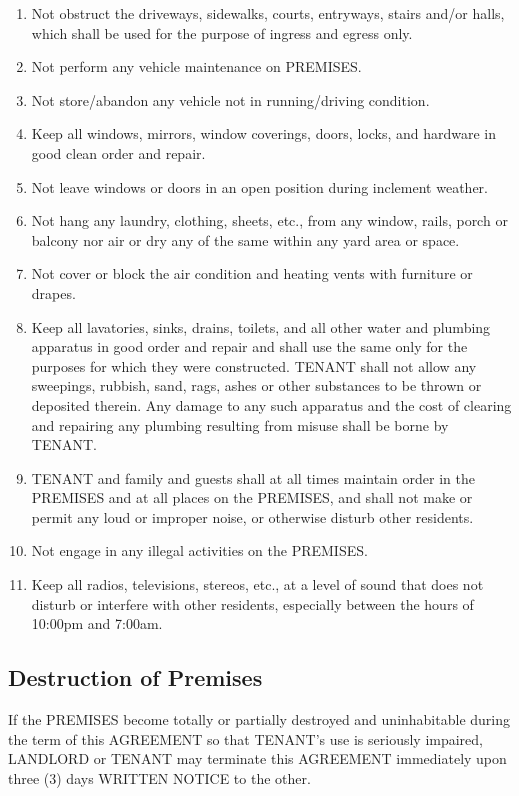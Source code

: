 \documentclass[11pt]{article}
\begin{document}
\begin{enumerate}
\item Not obstruct the driveways, sidewalks, courts, entryways, stairs
and/or halls, which shall be used for the purpose of ingress and
egress only.
\item Not perform any vehicle maintenance on PREMISES.
\item Not store/abandon any vehicle not in running/driving condition.
\item Keep all windows, mirrors, window coverings, doors, locks, and
hardware in good clean order and repair.
\item Not leave windows or doors in an open position during inclement weather.
\item Not hang any laundry, clothing, sheets, etc., from any window,
rails, porch or balcony nor air or dry any of the same within any
yard area or space.
\item Not cover or block the air condition and heating vents with
furniture or drapes.
\item Keep all lavatories, sinks, drains, toilets, and all other water
and plumbing apparatus in good order and repair and shall use the
same only for the purposes for which they were constructed.  TENANT
shall not allow any sweepings, rubbish, sand, rags, ashes or other
substances to be thrown or deposited therein.  Any damage to any
such apparatus and the cost of clearing and repairing any plumbing
resulting from misuse shall be borne by TENANT.
\item TENANT and family and guests shall at all times maintain order in
the PREMISES and at all places on the PREMISES, and shall not make
or permit any loud or improper noise, or otherwise disturb other
residents.
\item Not engage in any illegal activities on the PREMISES.
\item Keep all radios, televisions, stereos, etc., at a level of sound
that does not disturb or interfere with other residents,
especially between the hours of 10:00pm and 7:00am.
\end{enumerate}

\subsection{Destruction of Premises}
\label{sec:org67bb306}
If the PREMISES become totally or partially destroyed and
uninhabitable during the term of this AGREEMENT so that TENANT's use
is seriously impaired, LANDLORD or TENANT may terminate this AGREEMENT
immediately upon three (3) days WRITTEN NOTICE to the other.
\end{document}
